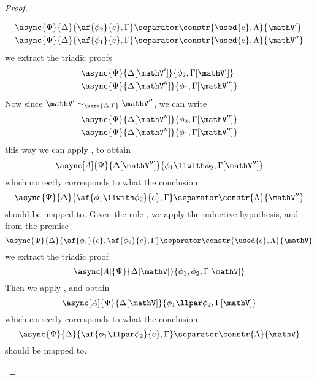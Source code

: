 \begin{proof}
\begin{itemize}
\begin{align*}
				&\async{\Psi}{\Delta}{\af{\phi_2}{e}, \Gamma} \separator \constr{\used{e}, \Lambda}{\mathV'} \\
				&\async{\Psi}{\Delta}{\af{\phi_1}{e}, \Gamma} \separator \constr{\used{e}, \Lambda}{\mathV''} 
			\end{align*}
			we extract the triadic proofs
			\begin{align*}
			 	&\async{\Psi}{\Delta[\mathV']}{\phi_2, \Gamma[\mathV']} \\
			 	&\async{\Psi}{\Delta[\mathV'']}{\phi_1, \Gamma[\mathV'']}
			\end{align*}
			Now since $\mathV' \sim_{\vars{\Delta, \Gamma}} \mathV''$, we can write
			\begin{align*}
				&\async{\Psi}{\Delta[\mathV'']}{\phi_2, \Gamma[\mathV'']} \\
				&\async{\Psi}{\Delta[\mathV'']}{\phi_1, \Gamma[\mathV'']}
			\end{align*}
			this way we can apply \derRule[A]{\displaywith}, to obtain
			$$ \async[A]{\Psi}{\Delta[\mathV'']}{\phi_1 \llwith \phi_2, \Gamma[\mathV'']} $$
			which correctly corresponds to what the conclusion
			$$ \async{\Psi}{\Delta}{\af{\phi_1 \llwith \phi_2}{e}, \Gamma} \separator \constr{\Lambda}{\mathV''} $$
			should be mapped to.
		\indCase{\displaypar} Given the rule \derRule{\displaypar}, we apply the inductive hypothesis, and from the premise
			$$ \async{\Psi}{\Delta}{\af{\phi_1}{e}, \af{\phi_2}{e}, \Gamma} \separator \constr{\used{e}, \Lambda}{\mathV}$$
			we extract the triadic proof 
			$$\async[A]{\Psi}{\Delta[\mathV]}{\phi_1, \phi_2, \Gamma[\mathV]} $$
			Then we apply \derRule[A]{\displaypar}, and obtain
			$$\async[A]{\Psi}{\Delta[\mathV]}{\phi_1 \llpar \phi_2, \Gamma[\mathV]} $$
			which correctly corresponds to what the conclusion
			$$ \async{\Psi}{\Delta}{\af{\phi_1 \llpar \phi_2}{e}, \Gamma} \separator \constr{\Lambda}{\mathV} $$
			should be mapped to.

\end{itemize}
\end{proof}
